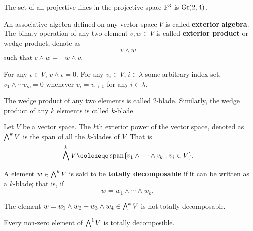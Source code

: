         \begin{example}[$\gr(2, 4)$]
        \label{ex:gr24}
            The set of all projective lines in the projective space $\P^3$ is $\gr(2, 4)$. 
        \end{example}
        
        An associative algebra defined on any vector space $V$ is called \textbf{exterior algebra}.
        The binary operation of any two element $v, w \in V$ is called \textbf{exterior product} or wedge product, denote as 
        \[
        v \wedge w
        \]
        such that $v \wedge w = - w \wedge v$. 
        \begin{example}
        \label{ex:v-wedge-v}
            For any $v \in V$, $v \wedge v = 0$.
            For any $v_i \in V$, 
            $i \in \lambda$ some arbitrary index set,
            $v_1 \wedge \cdots v_m = 0$ 
            whenever $v_i = v_{i + 1}$ for any $i \in \lambda$.
        \end{example}
        The wedge product of any two elements is called $2$-blade.
        Similarly,
        the wedge product of any $k$ elements is called
        $k$-blade. 
        
        \begin{definition}
        \label{def:exterior-power-of-a-vector-space}
            Let $V$ be a vector space.
            The $k$th exterior power of the vector space, denoted as $\bw^k V$ 
            is the span of all the $k$-blades of $V$.
            That is
            \[
            \bw^k V \coloneqq \vecspan{v_1 \wedge \cdots \wedge v_k: v_i \in V}. 
            \]
        \end{definition}
        
        \begin{definition}
        \label{def:totally-decomposible}
            A element $w \in \bw^k V$ is said to be \textbf{totally decomposable}
            if it can be written as a $k$-blade;
            that is, if 
            \[
            w = w_1 \wedge \cdots \wedge w_k,
            \]
        \end{definition}
        
        \begin{example}
        \label{ex:not-totally-decomposable}
            The element $w = w_1 \wedge w_2 + w_3 \wedge w_4 \in \bw^k V$ is not totally decomposable. 
        \end{example}
        
        \begin{example}
        \label{ex:totally-decomposible-1}
            Every non-zero element of $\bw^1 V$ is totally decomposible. 
        \end{example}
        
